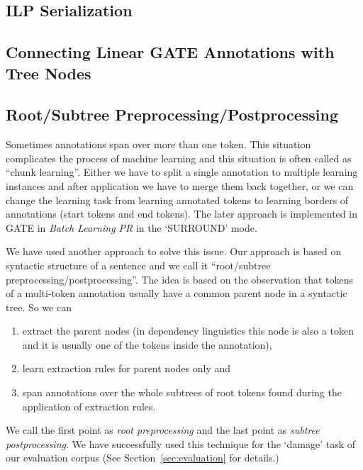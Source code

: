 \subsection{ILP Serialization} \label{sec:ilp_serialization}

\subsection{Connecting Linear GATE Annotations with Tree Nodes}


\subsection{Root/Subtree Preprocessing/Postprocessing}
Sometimes annotations span over more than one token. This situation complicates the process of machine learning and this situation is often called as ``chunk learning''. Either we have to split a single annotation to multiple learning instances and after application we have to merge them back together, or we can change the learning task from learning annotated tokens to learning borders of annotations (start tokens and end tokens). The later approach is implemented in GATE in \emph{Batch Learning PR} in the `SURROUND' mode.

We have used another approach to solve this issue. Our approach is based on syntactic structure of a sentence and we call it ``root/subtree preprocessing/postprocessing''. The idea is based on the observation that tokens of a multi-token annotation usually have a common parent node in a syntactic tree. So we can
\begin{enumerate}
	\item extract the parent nodes (in dependency linguistics this node is also a token and it is usually one of the tokens inside the annotation), 
	\item learn extraction rules for parent nodes only and 
	\item span annotations over the whole subtrees of root tokens found during the application of extraction rules.
\end{enumerate}
We call the first point as \emph{root preprocessing} and the last point as \emph{subtree postprocessing}. We have successfully used this technique for the `damage' task of our evaluation corpus (See Section~\ref{sec:evaluation} for details.)

